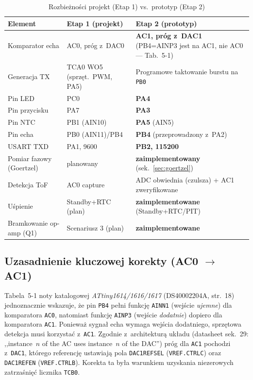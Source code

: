 \documentclass[a4paper,11pt]{article}
\begin{document}
\begin{table}[H]
	\centering
	\caption{Rozbieżności projekt (Etap 1) vs.\ prototyp (Etap 2)}
	\label{tab:zmiany}
	\begin{tabularx}{\textwidth}{p{3.2cm}XX}
		\toprule
		\textbf{Element} & \textbf{Etap 1 (projekt)} & \textbf{Etap 2 (prototyp)} \\
		\midrule
		Komparator echa & AC0, próg z~DAC0 & \textbf{AC1, próg z~DAC1} (PB4=AINP3 jest na AC1, nie AC0 --- Tab.~5-1) \\
		Generacja TX & TCA0 WO5 (sprzęt.\ PWM, PA5) & Programowe taktowanie burstu na \texttt{PB0} \\
		Pin LED & PC0 & \textbf{PA4} \\
		Pin przycisku & PA7 & \textbf{PA3} \\
		Pin NTC & PB1 (AIN10) & \textbf{PA5} (AIN5) \\
		Pin echa & PB0 (AIN11)/PB4 & \textbf{PB4} (przeprowadzony z~PA2) \\
		USART TXD & PA1, \SI{9600}{\baud} & \textbf{PB2, \SI{115200}{\baud}} \\
		Pomiar fazowy (Goertzel) & planowany & \textbf{zaimplementowany} (sek.~\ref{sec:goertzel}) \\
		Detekcja ToF & AC0 capture & ADC obwiednia (czulsza) + AC1 zweryfikowane \\
		Uśpienie & Standby+RTC (plan) & \textbf{zaimplementowane} (Standby+RTC/PIT) \\
		Bramkowanie op-amp (Q1) & Scenariusz 3 (plan) & \textbf{zaimplementowane} \\
		\bottomrule
	\end{tabularx}
\end{table}

\subsection{Uzasadnienie kluczowej korekty (AC0 $\to$ AC1)}

Tabela~5-1 noty katalogowej \textit{ATtiny1614/1616/1617} (DS40002204A, str.~18)
jednoznacznie wskazuje, że pin \texttt{PB4} pełni funkcję \texttt{AINN1}
(wejście \emph{ujemne}) dla komparatora \texttt{AC0}, natomiast funkcję
\texttt{AINP3} (wejście \emph{dodatnie}) dopiero dla komparatora \texttt{AC1}.
Ponieważ sygnał echa wymaga wejścia dodatniego, sprzętowa detekcja musi
korzystać z~\texttt{AC1}. Zgodnie z~architekturą układu (datasheet sek.~29:
,,instance~$n$ of the AC uses instance~$n$ of the DAC'') próg dla \texttt{AC1}
pochodzi z~\texttt{DAC1}, którego referencję ustawiają pola \texttt{DAC1REFSEL}
(\texttt{VREF.CTRLC}) oraz \texttt{DAC1REFEN} (\texttt{VREF.CTRLB}). Korekta ta
była warunkiem uzyskania niezerowych zatrzaśnięć licznika \texttt{TCB0}.
\end{document}
